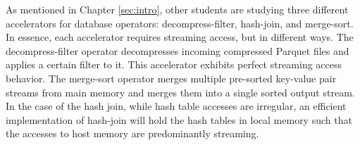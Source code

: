 
As mentioned in Chapter \ref{sec:intro}, other students are studying three different accelerators for database operators: decompress-filter, hash-join, and merge-sort. In essence, each accelerator requires streaming access, but in different ways. The decompress-filter operator decompresses incoming compressed Parquet files and applies a certain filter to it. This accelerator exhibits perfect streaming access behavior. The merge-sort operator merges multiple pre-sorted key-value pair streams from main memory and merges them into a single sorted output stream. In the case of the hash join, while hash table accesses are irregular, an efficient implementation of hash-join will hold the hash tables in local memory such that the accesses to host memory are predominantly streaming.






